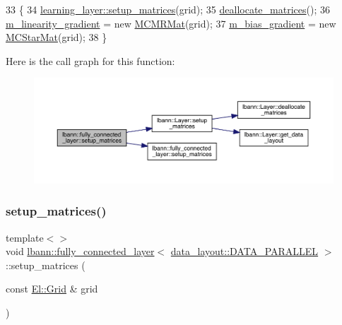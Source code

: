 \begin{DoxyCode}
33                                      \{
34   \hyperlink{classlbann_1_1Layer_a57bbe21131dc00ab5cf9ea5e3656808e}{learning\_layer::setup\_matrices}(grid);
35   \hyperlink{classlbann_1_1fully__connected__layer_a91f359a41cfbab6f21bd67bccb8409b1}{deallocate\_matrices}();
36   \hyperlink{classlbann_1_1fully__connected__layer_ab80f9cb94662ce4d90aa6d8b5cfa0803}{m\_linearity\_gradient} = \textcolor{keyword}{new} \hyperlink{base_8hpp_a50f80e25e2fbefe6b32d270b8d4f8d19}{MCMRMat}(grid);
37   \hyperlink{classlbann_1_1fully__connected__layer_a6510917c573378f40789a1d16db22b4e}{m\_bias\_gradient} = \textcolor{keyword}{new} \hyperlink{base_8hpp_a287f9e47262ac9f90fe0cf35073b9839}{MCStarMat}(grid);
38 \}
\end{DoxyCode}
Here is the call graph for this function\+:\nopagebreak
\begin{figure}[H]
\begin{center}
\leavevmode
\includegraphics[width=350pt]{classlbann_1_1fully__connected__layer_a1f0ae7a5f172e5ced011eaa2755fd04e_cgraph}
\end{center}
\end{figure}
\mbox{\label{classlbann_1_1fully__connected__layer_a9af60f901a84d5604badf078ecbae082}} 
\subsubsection{\texorpdfstring{setup\+\_\+matrices()}{setup\_matrices()}\hspace{0.1cm}{\footnotesize\ttfamily [2/3]}}
{\footnotesize\ttfamily template$<$$>$ \\
void \hyperlink{classlbann_1_1fully__connected__layer}{lbann\+::fully\+\_\+connected\+\_\+layer}$<$ \hyperlink{base_8hpp_a786677cbfb3f5677b4d84f3056eb08dba37d2a3465f7cbf4ab60f4e79944d0638}{data\+\_\+layout\+::\+D\+A\+T\+A\+\_\+\+P\+A\+R\+A\+L\+L\+EL} $>$\+::setup\+\_\+matrices (\begin{DoxyParamCaption}\item[{const \hyperlink{base_8hpp_a9951bb1719d534e0401b1f06cad19eab}{El\+::\+Grid} \&}]{grid }\end{DoxyParamCaption})\hspace{0.3cm}{\ttfamily [virtual]}}

